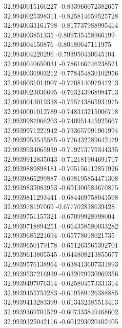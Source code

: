 {32.9940015166227	-0.833966072382657\\
32.9940025398311	-0.825814659525728\\
32.9940033161798	-0.817737988995414\\
32.994003851335	-0.809735458966199\\
32.994004150876	-0.80180647111975\\
32.994004220296	-0.793950430645104\\
32.9940040650031	-0.786166746238521\\
32.9940036903212	-0.778454830102956\\
32.9940031014907	-0.770814097947213\\
32.9940023036695	-0.763243968984713\\
32.9940013019338	-0.755743865931975\\
32.9940001012789	-0.748313215006718\\
32.9939987066203	-0.740951445925667\\
32.9939971227942	-0.733657991901994\\
32.9939953545585	-0.726432289642479\\
32.9939934065939	-0.719273779344335\\
32.9939912835043	-0.712181904691717\\
32.9939889898181	-0.705156112851926\\
32.9939865299887	-0.698195854471308\\
32.9939839083953	-0.691300583670875\\
32.9939811293441	-0.684469758041598\\
32.993978197069	-0.677702838639428\\
32.9939751157321	-0.67099928998004\\
32.9939718894251	-0.664358580033282\\
32.9939685221694	-0.65778018021735\\
32.9939650179178	-0.651263565392701\\
32.9939613805545	-0.644808213855677\\
32.9939576138964	-0.638413607331893\\
32.9939537216939	-0.632079230969356\\
32.9939497076314	-0.625804573331314\\
32.9939455753283	-0.619589126388885\\
32.9939413283399	-0.613432385513413\\
32.9939369701579	-0.607333849468602\\
32.9939325042116	-0.601293020402405\\
}

